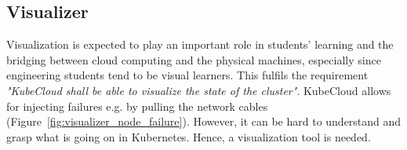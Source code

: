 
\subsection*{Visualizer}
Visualization is expected to play an important role in students' learning and the bridging between cloud computing and the physical machines, especially since engineering students tend to be visual learners. This fulfils the requirement \textit{"KubeCloud shall be able to visualize the state of the cluster"}. KubeCloud allows for injecting failures e.g. by pulling the network cables (Figure~\ref{fig:visualizer_node_failure}). However, it can be hard to understand and grasp what is going on in Kubernetes. Hence, a visualization tool is needed. 

\begin{figure}[H]%
    \centering
      \qquad
          \qquad

\end{figure}

